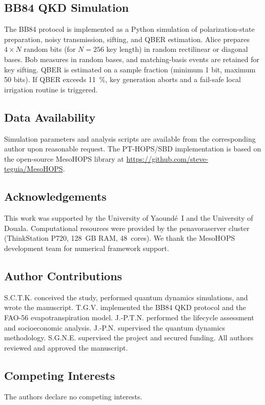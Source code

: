 \documentclass[12pt]{article}
\begin{document}
\subsection*{BB84 QKD Simulation}

The BB84 protocol is implemented as a Python simulation of polarization-state preparation, noisy transmission, sifting, and QBER estimation.
Alice prepares $4 \times N$ random bits (for $N = 256$ key length) in random rectilinear or diagonal bases.
Bob measures in random bases, and matching-basis events are retained for key sifting.
QBER is estimated on a sample fraction (minimum 1 bit, maximum 50 bits).
If QBER exceeds \SI{11}{\percent}, key generation aborts and a fail-safe local irrigation routine is triggered.

\subsection*{Data Availability}

Simulation parameters and analysis scripts are available from the corresponding author upon reasonable request.
The PT-HOPS/SBD implementation is based on the open-source MesoHOPS library at \url{https://github.com/steve-teguia/MesoHOPS}.

\subsection*{Acknowledgements}
This work was supported by the University of Yaound\'{e}~I and the University of Douala.
Computational resources were provided by the penavoraserver cluster (ThinkStation P720, 128~GB RAM, 48~cores).
We thank the MesoHOPS development team for numerical framework support.

\subsection*{Author Contributions}
S.C.T.K. conceived the study, performed quantum dynamics simulations, and wrote the manuscript.
T.G.V. implemented the BB84 QKD protocol and the FAO-56 evapotranspiration model.
J.-P.T.N. performed the lifecycle assessment and socioeconomic analysis.
J.-P.N. supervised the quantum dynamics methodology.
S.G.N.E. supervised the project and secured funding.
All authors reviewed and approved the manuscript.

\subsection*{Competing Interests}
The authors declare no competing interests.
\end{document}
